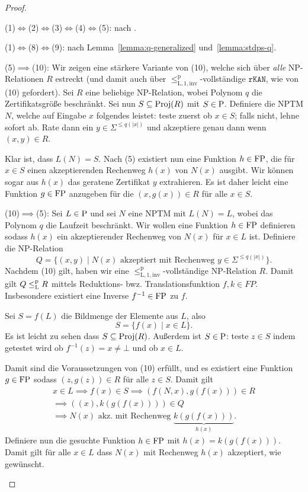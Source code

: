 \begin{proof}
\begin{prooflist}
\item (1)$\iff$(2)$\iff$(3)$\iff$(4)$\iff$(5): nach \textcite[Thm.~2]{fenner_inverting_2003}.

\item (1)$\iff$(8)$\iff$(9): nach Lemma~\ref{lemma:q-generalized} und~\ref{lemma:stdps-q}.

\item (5)$\implies$(10): Wir zeigen eine stärkere Variante von (10), welche sich über \emph{alle} NP-Relationen $R$ estreckt (und damit auch über $\leq_\mathrm{L,1,inv}^\mathrm p$-vollständige $\mathtt{rKAN}$, wie von (10) gefordert). Sei $R$ eine beliebige  NP-Relation, wobei Polynom $q$ die Zertifikatsgröße beschränkt. Sei nun $S\subseteq \Proj(R)$ mit $S\in \P$. Definiere die NPTM $N$, welche auf Eingabe $x$ folgendes leistet: teste zuerst ob $x\in S$; falls nicht, lehne sofort ab. Rate dann ein $y\in\Sigma^{\leq q(|x|)}$ und akzeptiere genau dann wenn $(x,y)\in R$. 

    Klar ist, dass $L(N)=S$. Nach (5) existiert nun eine Funktion $h\in \FP$, die für $x\in S$ einen akzeptierenden Rechenweg $h(x)$ von $N(x)$ ausgibt. Wir können sogar aus $h(x)$ das geratene Zertifikat $y$ extrahieren. Es ist daher leicht eine Funktion $g\in \FP$ anzugeben für die $(x,g(x))\in R$ für alle $x\in S$.

\item (10)$\implies$(5): Sei $L\in \P$ und sei $N$ eine NPTM mit $L(N)=L$, wobei das Polynom $q$ die Laufzeit beschränkt. Wir wollen eine Funktion $h\in\FP$ definieren sodass $h(x)$ ein akzeptierender Rechenweg von $N(x)$ für $x\in L$ ist. Definiere die NP-Relation
    \[ Q = \{ (x, y) \mid \text{$N(x)$ akzeptiert mit Rechenweg $y\in\Sigma^{\leq q(|x|)}$} \}. \]
    Nachdem (10) gilt, haben wir eine $\leq_\mathrm{L,1,inv}^\mathrm p$-vollständige NP-Relation $R$. Damit gilt $Q\leqlp R$ mittels Reduktions- bwz. Translationsfunktion $f, k\in FP$. Insbesondere existiert eine Inverse $f^{-1}\in\FP$ zu $f$.

    Sei $S=f(L)$ die Bildmenge der Elemente aus $L$, also 
    \[ S= \{f(x) \mid x\in L\}. \]
    Es ist leicht zu sehen dass $S\subseteq \Proj(R)$. Außerdem ist $S\in \P$: teste $z\in S$ indem getestet wird ob $f^{-1}(z)=x\neq\bot$ und ob $x\in L$.

    Damit sind die Voraussetzungen von (10) erfüllt, und es existiert eine Funktion $g\in \FP$ sodass $(z,g(z))\in R$ für alle $z\in S$. Damit gilt
    \begin{gather*}x\in L \implies f(x) \in S \implies (f(N,x), g(f(x)))\in R\\ \implies ((x), k(g(f(x))))\in Q\\
    \implies N(x) \text{ akz. mit Rechenweg $\underbrace{k(g(f(x)))}_{h(x)}$. }
\end{gather*}
    Definiere nun die gesuchte Funktion $h\in \FP$ mit $h(x) = k(g(f(x)))$. Damit gilt für alle $x\in L$ dass $N(x)$ mit Rechenweg $h(x)$ akzeptiert, wie gewünscht.


\end{prooflist}
\end{proof}
